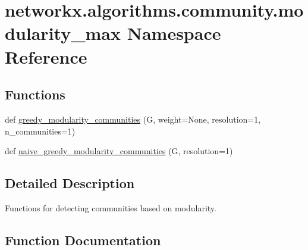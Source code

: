 \hypertarget{namespacenetworkx_1_1algorithms_1_1community_1_1modularity__max}{}\section{networkx.\+algorithms.\+community.\+modularity\+\_\+max Namespace Reference}
\label{namespacenetworkx_1_1algorithms_1_1community_1_1modularity__max}
\subsection*{Functions}
\begin{DoxyCompactItemize}
\item 
def \hyperlink{namespacenetworkx_1_1algorithms_1_1community_1_1modularity__max_af1cac97e7c364eefa26bb23e56f2f10e}{greedy\+\_\+modularity\+\_\+communities} (G, weight=None, resolution=1, n\+\_\+communities=1)
\item 
def \hyperlink{namespacenetworkx_1_1algorithms_1_1community_1_1modularity__max_a60686893613d98cae2604ab2fb51d6f5}{naive\+\_\+greedy\+\_\+modularity\+\_\+communities} (G, resolution=1)
\end{DoxyCompactItemize}


\subsection{Detailed Description}
\begin{DoxyVerb}Functions for detecting communities based on modularity.\end{DoxyVerb}
 

\subsection{Function Documentation}
\mbox{\label{namespacenetworkx_1_1algorithms_1_1community_1_1modularity__max_af1cac97e7c364eefa26bb23e56f2f10e}} 
